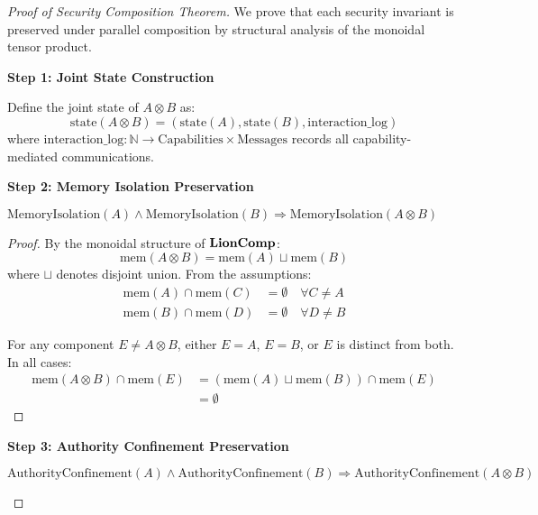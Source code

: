 \begin{proof}[Proof of Security Composition Theorem]
We prove that each security invariant is preserved under parallel composition by structural analysis of the monoidal tensor product.

\textbf{Step 1: Joint State Construction}

Define the joint state of $A \otimes B$ as:
\begin{equation}
\text{state}(A \otimes B) = (\text{state}(A), \text{state}(B), \text{interaction\_log})
\end{equation}
where $\text{interaction\_log}: \mathbb{N} \to \text{Capabilities} \times \text{Messages}$ records all capability-mediated communications.

\textbf{Step 2: Memory Isolation Preservation}

\begin{lemma}
$\text{MemoryIsolation}(A) \land \text{MemoryIsolation}(B) \Rightarrow \text{MemoryIsolation}(A \otimes B)$
\end{lemma}

\begin{proof}
By the monoidal structure of $\mathbf{LionComp}$:
\begin{equation}
\text{mem}(A \otimes B) = \text{mem}(A) \sqcup \text{mem}(B)
\end{equation}
where $\sqcup$ denotes disjoint union. From the assumptions:
\begin{align}
\text{mem}(A) \cap \text{mem}(C) &= \emptyset \quad \forall C \neq A \\
\text{mem}(B) \cap \text{mem}(D) &= \emptyset \quad \forall D \neq B
\end{align}

For any component $E \neq A \otimes B$, either $E = A$, $E = B$, or $E$ is distinct from both. In all cases:
\begin{align}
\text{mem}(A \otimes B) \cap \text{mem}(E) &= (\text{mem}(A) \sqcup \text{mem}(B)) \cap \text{mem}(E) \nonumber \\
&= \emptyset
\end{align}
\end{proof}

\textbf{Step 3: Authority Confinement Preservation}

\begin{lemma}
$\text{AuthorityConfinement}(A) \land \text{AuthorityConfinement}(B) \Rightarrow \text{AuthorityConfinement}(A \otimes B)$
\end{lemma}


\end{proof}
